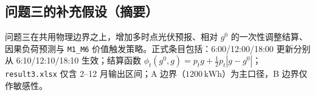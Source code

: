 \subsection{问题三的补充假设（摘要）}
问题三在共用物理边界之上，增加多时点光伏预报、相对 $g^0$ 的一次性调整结算、因果负荷预测与 \texttt{M1\_M6} 价值触发策略。正式条目包括：6:00/12:00/18:00 更新分别从 6:10/12:10/18:10 生效；结算函数 $\phi_t(g^0,g)=p_tg+\tfrac12 p_t|g-g^0|$；\texttt{result3.xlsx} 仅含 2--12 月输出区间；A 边界（$1200\,\mathrm{kWh}$）为主口径，B 边界仅作敏感性。
